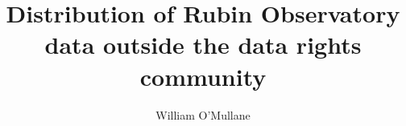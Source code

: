 \documentclass[DM,authoryear,toc]{lsstdoc}
\title{Distribution of Rubin Observatory data outside the data rights community}
\author{%
William O'Mullane
}
\date{\vcsDate}
\begin{document}
\mkshorttitle



\appendix
\label{sec:bib}


%
\end{document}
